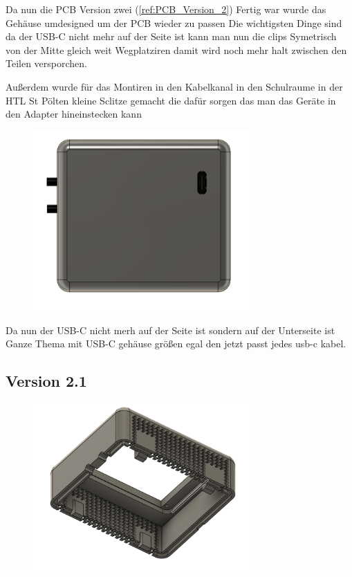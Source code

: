 \begin{inhalt}
Da nun die PCB Version zwei (\ref{ref:PCB_Version_2}) Fertig war wurde das Gehäuse umdesigned um der PCB wieder zu passen Die wichtigsten Dinge sind da der USB-C nicht mehr auf der Seite ist kann man nun die clips Symetrisch von der Mitte gleich weit Wegplatziren damit wird noch mehr halt zwischen den Teilen versporchen.  

Außerdem wurde für das Montiren in den Kabelkanal in den Schulraume in der HTL St Pölten  kleine Sclitze gemacht die dafür sorgen das man das Geräte in den Adapter hineinstecken kann

\begin{figure}[!htb]
\centering
\includegraphics[width=0.75\textwidth]{files/Thomas/pics/geheause/2.0/gehaeuse_bot.png}
\caption[Bildbezeichnung für Abbildungsverzeichnis]{}
\label{fig:gehaeuse_internet_bild}
\end{figure}

Da nun der USB-C nicht merh auf der Seite ist sondern auf der Unterseite ist Ganze Thema mit USB-C gehäuse größen egal den jetzt passt jedes usb-c kabel. 

\subsection{Version 2.1}

\begin{figure}[!htb]
\centering
\includegraphics[width=0.75\textwidth]{files/Thomas/pics/geheause/2.1/gehaeuse_side.png}
\caption[Bildbezeichnung für Abbildungsverzeichnis]{}
\label{fig:gehaeuse_internet_bild}
\end{figure}


\end{inhalt}
